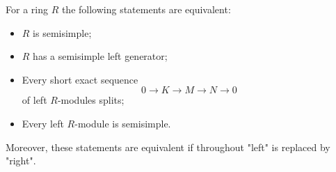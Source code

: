 For a ring $R$ the following statements are equivalent:
\begin{itemize}
\item[(a)] $R$ is semisimple;
\item[(b)] $R$ has a semisimple left generator;
\item[(c)] Every short exact sequence
$$0 \to K \to M \to N \to 0$$
of left $R$-modules splits;
\item[(d)] Every left $R$-module is semisimple.
\end{itemize}
Moreover, these statements are equivalent if throughout "left" is replaced by "right".
